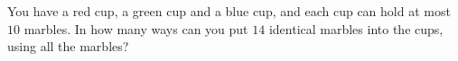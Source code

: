 You have a red cup, a green cup and a blue cup, and each cup can hold at most $10$ marbles. In how many ways can you put $14$ identical marbles into the cups, using all the marbles?
